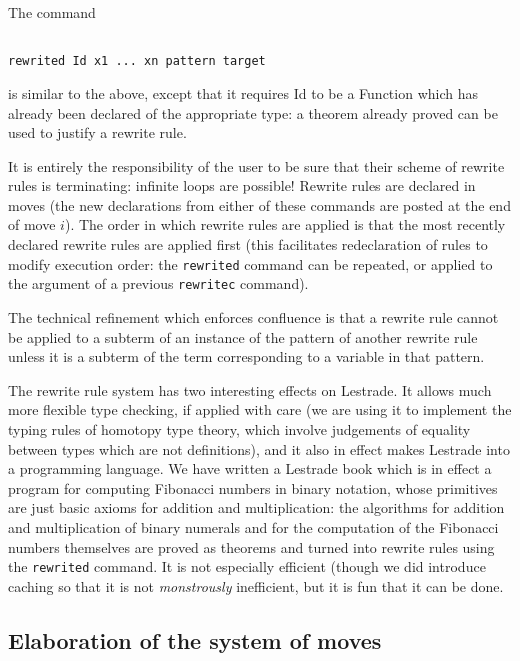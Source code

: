 \documentclass[12pt]{article}
\begin{document}
The command 

\begin{verbatim}

rewrited Id x1 ... xn pattern target

\end{verbatim}
is similar to the above, except that it requires Id to be a Function which has already been declared of the appropriate type:  a theorem already proved can be used to justify a rewrite rule.

It is entirely the responsibility of the user to be sure that their scheme of rewrite rules is terminating:  infinite loops are possible!  Rewrite rules are declared in moves (the new declarations from either of these commands are posted at the end of move $i$).  The order in which rewrite rules are applied is that the most recently declared rewrite rules are applied first (this facilitates redeclaration of rules to modify execution order:  the {\tt rewrited} command can be repeated, or applied to the argument of a previous {\tt rewritec} command).

The technical refinement which enforces confluence is that a rewrite rule cannot be applied to a subterm of an instance of the pattern of another rewrite rule unless it is a subterm of the term corresponding to a variable in that pattern.

The rewrite rule system has two interesting effects on Lestrade.  It allows much more flexible type checking, if applied with care (we are using it to implement the typing rules of homotopy type theory, which involve judgements of equality between types which are not definitions), and it also in effect makes Lestrade into a programming language.  We have written a Lestrade book which is in effect a program for computing Fibonacci numbers in binary notation, whose primitives are just basic axioms for addition and multiplication:  the algorithms for addition and multiplication of binary numerals and for the computation of the Fibonacci numbers themselves are proved as theorems and turned into rewrite rules using the {\tt rewrited} command.  It is not especially efficient (though we did introduce caching so that it is not {\em monstrously\/} inefficient, but it is fun that it can be done.

\subsection{Elaboration of the system of moves}
\end{document}
